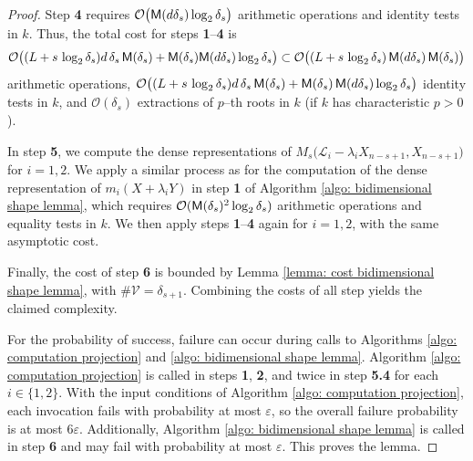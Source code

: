 \documentclass[pdflatex,sn-basic]{sn-jnl}%
\theoremstyle{thmstyleone}%
\theoremstyle{thmstyletwo}%
\theoremstyle{thmstylethree}%
\theoremstyle{definition}
\numberwithin{equation}{section}
\begin{document}
\begin{proof}
Step {\bf 4} requires $\mathcal{O}\big({\sf
M}(d\delta_s)\log_2\delta_s\big)$ arithmetic operations and identity
tests in $k$. Thus, the total cost for steps {\bf 1}--{\bf 4} is
%
$$\mathcal{O}\big((L+s\,\log_2\delta_s)d\,\delta_s\,{\sf M}(\delta_s)
+{\sf M}(\delta_s){\sf M}(d\delta_s)\log_2\delta_s\big)\subset
\mathcal{O}\big((L+s\,\log_2\delta_s)\,{\sf M}(d\delta_s)\,{\sf M}(\delta_s)
\big)$$
%
arithmetic operations,
$\mathcal{O}\big((L+s\,\log_2\delta_s)d\,\delta_s\,{\sf
M}(\delta_s)+{\sf M}(\delta_s)\,{\sf
M}(d\delta_s)\log_2\delta_s\big)$ identity tests in $k$, and
$\mathcal{O}(\delta_s)$ extractions of $p$--th roots in $k$ (if $k$
has characteristic $p>0$).

In step {\bf 5}, we compute the dense representations of
$M_s\big(\mathcal{L}_i-\lambda_iX_{n-s+1},X_{n-s+1}\big)$ for
$i=1,2$. We apply a similar process as for the computation of the
dense representation of $m_i(X+\lambda_i Y)$ in step {\bf 1} of
Algorithm \ref{algo: bidimensional shape lemma}, which requires
$\mathcal{O}({\sf M}(\delta_s)^2\log_2\delta_s)$ arithmetic
operations and equality tests in $k$. We then apply steps {\bf
1}--{\bf 4} again for $i=1,2$, with the same asymptotic cost.

Finally, the cost of step {\bf 6} is bounded by Lemma \ref{lemma:
cost bidimensional shape lemma}, with $\#\mathcal{V}=\delta_{s+1}$.
Combining the costs of all step yields the claimed complexity.

For the probability of success, failure can occur during calls to
Algorithms \ref{algo: computation projection} and \ref{algo:
bidimensional shape lemma}. Algorithm \ref{algo: computation
projection} is called in steps {\bf 1}, {\bf 2}, and twice in step
{\bf 5.4} for each $i\in\{1,2\}$. With the input conditions of
Algorithm \ref{algo: computation projection}, each invocation fails
with probability at most $\varepsilon$, so the overall failure
probability is at most $6\varepsilon$. Additionally, Algorithm
\ref{algo: bidimensional shape lemma} is called in step {\bf 6} and
may fail with probability at most $\varepsilon$. This proves the
lemma.
\end{proof}
\end{document}
